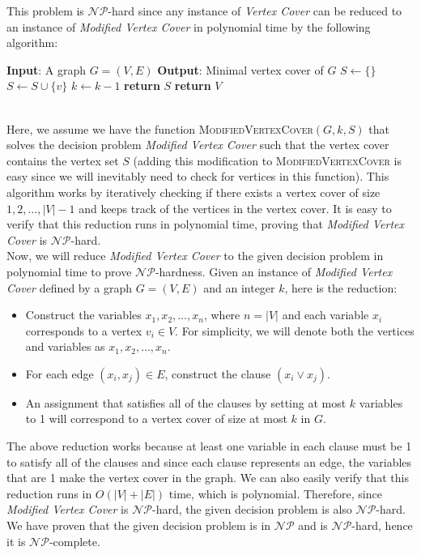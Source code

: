 \documentclass{article}
\begin{document}
  This problem is $\mathcal{NP}$-hard since any instance of \textit{Vertex Cover} can be reduced to an instance of \textit{Modified Vertex Cover} in polynomial time by the following algorithm:
  \begin{algorithm}
    \caption{Reduction from \textit{Vertex Cover} to \textit{Modified Vertex Cover}}
    \begin{algorithmic}[1]
      \State \textbf{Input}: A graph $G = (V, E)$
      \State \textbf{Output}: Minimal vertex cover of $G$
        \State $S \gets \{\}$
            \State $S \gets S \cup \{v\}$
            \State $k \gets k - 1$
          \EndIf
        \EndFor
          \State \textbf{return} $S$
        \EndIf
      \EndFor
      \State \textbf{return} $V$
    \end{algorithmic}
  \end{algorithm} \\
  Here, we assume we have the function \textsc{ModifiedVertexCover}$(G, k, S)$ that solves the decision problem \textit{Modified Vertex Cover} such that the vertex cover contains the vertex set $S$ (adding this modification to \textsc{ModifiedVertexCover} is easy since we will inevitably need to check for vertices in this function).
  This algorithm works by iteratively checking if there exists a vertex cover of size $1, 2, \dots, |V| -1$ and keeps track of the vertices in the vertex cover.
  It is easy to verify that this reduction runs in polynomial time, proving that \textit{Modified Vertex Cover} is $\mathcal{NP}$-hard. \\
  Now, we will reduce \textit{Modified Vertex Cover} to the given decision problem in polynomial time to prove $\mathcal{NP}$-hardness.
  Given an instance of \textit{Modified Vertex Cover} defined by a graph $G = (V, E)$ and an integer $k$, here is the reduction:
  \begin{itemize}
    \item Construct the variables $x_1, x_2, \dots, x_n$, where $n = |V|$ and each variable $x_i$ corresponds to a vertex $v_i \in V$.
    For simplicity, we will denote both the vertices and variables as $x_1, x_2, \dots, x_n$.
    \item For each edge $(x_i, x_j) \in E$, construct the clause $(x_i \lor x_j)$.
    \item An assignment that satisfies all of the clauses by setting at most $k$ variables to 1 will correspond to a vertex cover of size at most $k$ in $G$.
  \end{itemize}
  The above reduction works because at least one variable in each clause must be 1 to satisfy all of the clauses and since each clause represents an edge, the variables that are 1 make the vertex cover in the graph.
  We can also easily verify that this reduction runs in $O(|V| + |E|)$ time, which is polynomial.
  Therefore, since \textit{Modified Vertex Cover} is $\mathcal{NP}$-hard, the given decision problem is also $\mathcal{NP}$-hard. \\
  We have proven that the given decision problem is in $\mathcal{NP}$ and is $\mathcal{NP}$-hard, hence it is $\mathcal{NP}$-complete.
\end{document}
